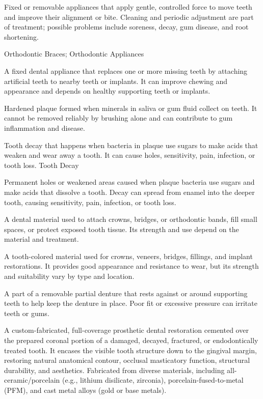 Fixed or removable appliances that apply gentle, controlled force to move teeth and improve their alignment or bite. Cleaning and periodic adjustment are part of treatment; possible problems include soreness, decay, gum disease, and root shortening.

\synonyms
Orthodontic Braces; Orthodontic Appliances

 A fixed dental appliance that replaces one or more missing teeth by attaching artificial teeth to nearby teeth or implants. It can improve chewing and appearance and depends on healthy supporting teeth or implants.

 Hardened plaque formed when minerals in saliva or gum fluid collect on teeth. It cannot be removed reliably by brushing alone and can contribute to gum inflammation and disease.

 Tooth decay that happens when bacteria in plaque use sugars to make acids that weaken and wear away a tooth. It can cause holes, sensitivity, pain, infection, or tooth loss.
\synonyms
Tooth Decay

 Permanent holes or weakened areas caused when plaque bacteria use sugars and make acids that dissolve a tooth. Decay can spread from enamel into the deeper tooth, causing sensitivity, pain, infection, or tooth loss.

 A dental material used to attach crowns, bridges, or orthodontic bands, fill small spaces, or protect exposed tooth tissue. Its strength and use depend on the material and treatment.

 A tooth-colored material used for crowns, veneers, bridges, fillings, and implant restorations. It provides good appearance and resistance to wear, but its strength and suitability vary by type and location.

 A part of a removable partial denture that rests against or around supporting teeth to help keep the denture in place. Poor fit or excessive pressure can irritate teeth or gums.

 A custom-fabricated, full-coverage prosthetic dental restoration cemented over the prepared coronal portion of a damaged, decayed, fractured, or endodontically treated tooth. It encases the visible tooth structure down to the gingival margin, restoring natural anatomical contour, occlusal masticatory function, structural durability, and aesthetics. Fabricated from diverse materials, including all-ceramic/porcelain (e.g., lithium disilicate, zirconia), porcelain-fused-to-metal (PFM), and cast metal alloys (gold or base metals).

